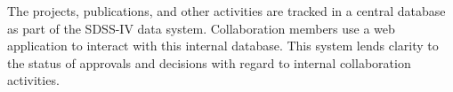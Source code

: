 The projects, publications, and other activities are tracked in a
central database as part of the SDSS-IV data system. Collaboration
members use a web application to interact with this internal database.
This system lends clarity to the status of approvals and decisions
with regard to internal collaboration activities.
